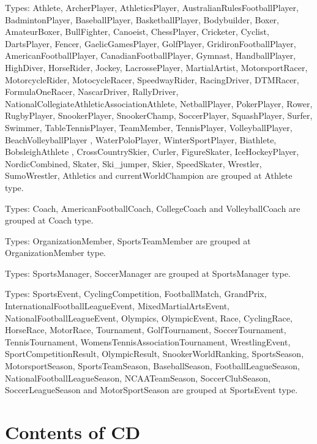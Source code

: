 \documentclass[thesis=M,english]{FITthesis}[2018/05/30]
\begin{document}
Types: Athlete, ArcherPlayer, AthleticsPlayer, AustralianRulesFootballPlayer, BadmintonPlayer, BaseballPlayer, BasketballPlayer, Bodybuilder, Boxer, AmateurBoxer, BullFighter, Canoeist, ChessPlayer, Cricketer, Cyclist, DartsPlayer, Fencer, GaelicGamesPlayer, GolfPlayer, GridironFootballPlayer, AmericanFootballPlayer, CanadianFootballPlayer, Gymnast, HandballPlayer, HighDiver, HorseRider, Jockey, LacrossePlayer, MartialArtist, MotorsportRacer, MotorcycleRider, MotocycleRacer, SpeedwayRider, RacingDriver, DTMRacer, FormulaOneRacer, NascarDriver, RallyDriver, NationalCollegiateAthleticAssociationAthlete, NetballPlayer, PokerPlayer, Rower, RugbyPlayer, SnookerPlayer, SnookerChamp, SoccerPlayer, SquashPlayer, Surfer, Swimmer, TableTennisPlayer, TeamMember, TennisPlayer, VolleyballPlayer, BeachVolleyballPlayer , WaterPoloPlayer, WinterSportPlayer, Biathlete, BobsleighAthlete , CrossCountrySkier, Curler, FigureSkater, IceHockeyPlayer, NordicCombined, Skater, Ski\_jumper, Skier, SpeedSkater, Wrestler, SumoWrestler, Athletics and currentWorldChampion are grouped at Athlete type.

Types: Coach, AmericanFootballCoach, CollegeCoach and VolleyballCoach are grouped at Coach type.

Types: OrganizationMember, SportsTeamMember are grouped at OrganizationMember type.

Types: SportsManager, SoccerManager are grouped at SportsManager type.

Types: SportsEvent, CyclingCompetition, FootballMatch, GrandPrix, InternationalFootballLeagueEvent, MixedMartialArtsEvent, NationalFootballLeagueEvent, Olympics, OlympicEvent, Race, CyclingRace, HorseRace, MotorRace, Tournament, GolfTournament, SoccerTournament, TennisTournament, WomensTennisAssociationTournament, WrestlingEvent, SportCompetitionResult, OlympicResult, SnookerWorldRanking, SportsSeason, MotorsportSeason, SportsTeamSeason, BaseballSeason, FootballLeagueSeason, NationalFootballLeagueSeason, NCAATeamSeason, SoccerClubSeason, SoccerLeagueSeason and MotorSportSeason are grouped at SportsEvent type. 

\chapter{Contents of CD}\label{app:CDcontent}

\end{document}
